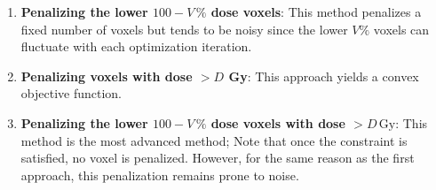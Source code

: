 \begin{enumerate}
	\item \textbf{Penalizing the lower $100-V\,\%$ dose voxels}:
	This method penalizes a fixed number of voxels but tends to be noisy since the lower $V\%$ voxels can fluctuate with each optimization iteration.
	\item \textbf{Penalizing voxels with dose $>D$ Gy}:
	This approach yields a convex objective function.
	\item \textbf{Penalizing the lower $100-V\,\%$ dose voxels with dose $>D\,\text{Gy}$}:
	This method is the most advanced method; 
	Note that once the constraint is satisfied, no voxel is penalized.
	However, for the same reason as the first approach, this penalization remains prone to noise.
\end{enumerate}

